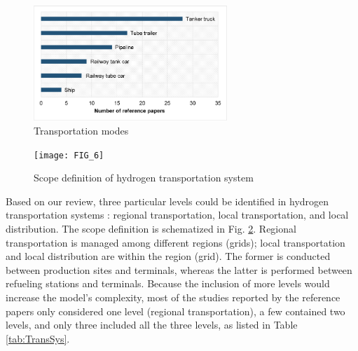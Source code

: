 \documentclass[11pt,3p]{elsarticle}
\begin{document}
\begin{figure}[!htbp]
\centering
\includegraphics[width=0.65\textwidth]{FIG_5}
\caption{\label{fig:TransportMode}Transportation modes}
\end{figure}

\begin{figure}[!htbp]
\centering
\texttt{[image: FIG\_6]}
\caption{\label{fig:ScopeDefHydrogenTrans}Scope definition of hydrogen transportation system}
\end{figure}

Based on our review, three particular levels could be identified in hydrogen transportation systems \citep{almansoori2006design,almansoori2009design,almansoori2012design}: regional transportation, local transportation, and local distribution. The scope definition is schematized in Fig. \ref{fig:ScopeDefHydrogenTrans}. Regional transportation is managed among different regions (grids); local transportation and local distribution are within the region (grid). The former is conducted between production sites and terminals, whereas the latter is performed between refueling stations and terminals. Because the inclusion of more levels would increase the model's complexity, most of the studies reported by the reference papers only considered one level (regional transportation), a few contained two levels, and only three included all the three levels, as listed in Table \ref{tab:TransSys}.
\end{document}
